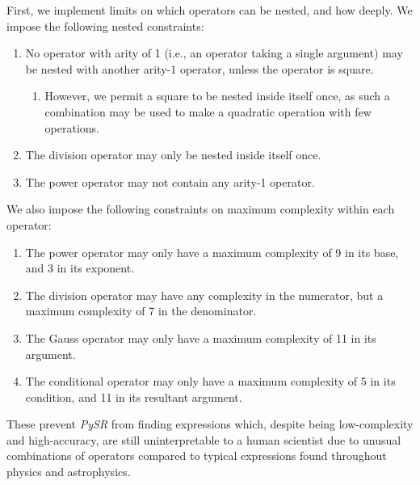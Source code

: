 \documentclass[nohyperref]{article}
\newcommand\pysr{\textit{PySR}\xspace}
\theoremstyle{plain}
\theoremstyle{definition}
\theoremstyle{remark}
\begin{document}
First, we implement limits on which operators can be nested, and how deeply.
We impose the following nested constraints:
\begin{enumerate}
    \item No operator with arity of 1 (i.e., an operator taking a single argument) may be nested with another arity-1 operator, unless the operator is square.
    \begin{enumerate}
        \item However, we permit a square to be nested inside itself once, as such a combination may be used to make a quadratic operation with few operations.
    \end{enumerate}
    \item The division operator may only be nested inside itself once.
    \item The power operator may not contain any arity-1 operator.
\end{enumerate}
We also impose the following constraints on maximum complexity within each operator:
\begin{enumerate}
    \item The power operator may only have a maximum complexity of 9 in its base, and 3 in its exponent.
    \item The division operator may have any complexity in the numerator, but a maximum complexity of 7 in the denominator.
    \item The Gauss operator may only have a maximum complexity of 11 in its argument.
    \item The conditional operator may only have a maximum complexity of 5 in its condition, and 11 in its resultant argument.
\end{enumerate}
These prevent \pysr from finding expressions which, despite being low-complexity and high-accuracy, are still uninterpretable to a human scientist due to unusual combinations of operators compared to typical expressions found throughout physics and astrophysics.
\end{document}

